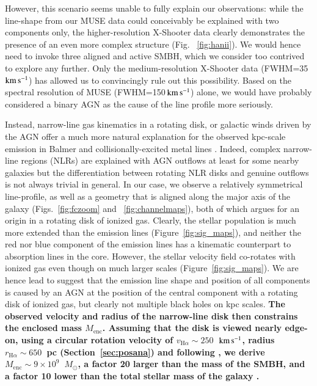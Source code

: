 \documentclass[traditabstract]{aa}
\newcommand{\kms}{$\rm{km\,s^{-1}}$}
\newcommand{\Msun}{$M_\odot$}
\begin{document}
However, this scenario seems unable to fully explain our observations: while the line-shape from our MUSE data could conceivably be explained with two components only, the higher-resolution X-Shooter data clearly demonstrates the presence of an even more complex structure (Fig. ~\ref{fig:hanii}). We would hence need to invoke three aligned and active SMBH, which we consider too contrived to explore any further. Only the medium-resolution X-Shooter data (FWHM=35\,\kms) has allowed us to convincingly rule out this possibility. Based on the spectral resolution of  MUSE (FWHM=150\,\kms) alone, we would have probably considered a binary AGN as the cause of the line profile more seriously.

Instead, narrow-line gas kinematics in a rotating disk, or galactic winds driven by the AGN offer a much more natural explanation for the observed kpc-scale emission in Balmer and collisionally-excited metal lines \citep[e.g.,][]{2011ApJ...735...48S}. Indeed, complex narrow-line regions (NLRs) are explained with AGN outflows at least for some nearby galaxies \citep[e.g.,][]{2011ApJ...727...71F} but the differentiation between rotating NLR disks and genuine outflows is not always trivial \citep{2011ApJ...735...48S, 2015ApJ...813..103M} in general. In our case, we observe a relatively symmetrical line-profile, as well as a geometry that is aligned along the major axis of the galaxy (Figs.~\ref{fig:fczoom} and~ \ref{fig:channelmaps}), both of which argues for an origin in a rotating disk of ionized gas. Clearly, the stellar population is much more extended than the emission lines (Figure~\ref{fig:sig_maps}), and neither the red nor blue component of the emission lines has a kinematic counterpart to absorption lines in the core. However, the stellar velocity field co-rotates with ionized gas even though on much larger scales (Figure~\ref{fig:sig_maps}). We are hence lead to suggest that the emission line shape and position of all components is caused by an AGN at the position of the central component with a rotating disk of ionized gas, but clearly not multiple black holes on kpc scales. \textbf{The observed velocity and radius of the narrow-line disk then constrains the enclosed mass $M_\mathrm{enc}$. Assuming that the disk is viewed nearly edge-on, using a circular rotation velocity of $v_{\mathrm{H}\alpha}\sim250$~\kms, radius $r_{\mathrm{H}\alpha}\sim650$~pc (Section~\ref{sec:posana}) and following \citet{2003ApJ...592...42G}, we derive $M_\mathrm{enc}\sim 9 \times 10^{9}$~\Msun, a factor 20 larger than the mass of the SMBH, and a factor 10 lower than the total stellar mass of the galaxy \cite{2016NatAs...1E...2L}.}
\end{document}
